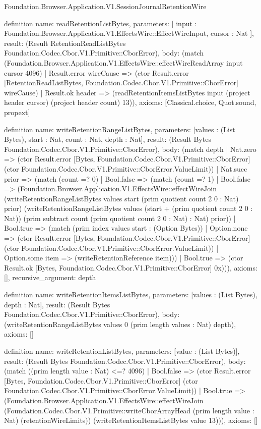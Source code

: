 \begin{lexlean}{Foundation.Browser.Application.V1.SessionJournalRetentionWire}
\begin{semanticmodule}
definition{
  name: readRetentionListBytes,
  parameters: [
    input : Foundation.Browser.Application.V1.EffectsWire::EffectWireInput,
    cursor : Nat
  ],
  result: (Result RetentionReadListBytes Foundation.Codec.Cbor.V1.Primitive::CborError),
  body: (match (Foundation.Browser.Application.V1.EffectsWire::effectWireReadArray input cursor 4096)
    | Result.error wireCause => (ctor Result.error [RetentionReadListBytes, Foundation.Codec.Cbor.V1.Primitive::CborError] wireCause)
    | Result.ok header => (readRetentionItemsListBytes input (project header cursor) (project header count) 13)),
  axioms: [Classical.choice, Quot.sound, propext]
}

definition{
  name: writeRetentionRangeListBytes,
  parameters: [values : (List Bytes), start : Nat, count : Nat, depth : Nat],
  result: (Result Bytes Foundation.Codec.Cbor.V1.Primitive::CborError),
  body: (match depth
    | Nat.zero => (ctor Result.error [Bytes, Foundation.Codec.Cbor.V1.Primitive::CborError] (ctor Foundation.Codec.Cbor.V1.Primitive::CborError.ValueLimit))
    | Nat.succ prior => (match (count =? 0)
      | Bool.false => (match (count =? 1)
        | Bool.false => (Foundation.Browser.Application.V1.EffectsWire::effectWireJoin (writeRetentionRangeListBytes values start (prim quotient count 2 0 : Nat) prior) (writeRetentionRangeListBytes values (start + (prim quotient count 2 0 : Nat)) (prim subtract count (prim quotient count 2 0 : Nat) : Nat) prior))
        | Bool.true => (match (prim index values start : (Option Bytes))
          | Option.none => (ctor Result.error [Bytes, Foundation.Codec.Cbor.V1.Primitive::CborError] (ctor Foundation.Codec.Cbor.V1.Primitive::CborError.ValueLimit))
          | Option.some item => (writeRetentionReference item)))
      | Bool.true => (ctor Result.ok [Bytes, Foundation.Codec.Cbor.V1.Primitive::CborError] 0x))),
  axioms: [],
  recursive_argument: depth
}

definition{
  name: writeRetentionItemsListBytes,
  parameters: [values : (List Bytes), depth : Nat],
  result: (Result Bytes Foundation.Codec.Cbor.V1.Primitive::CborError),
  body: (writeRetentionRangeListBytes values 0 (prim length values : Nat) depth),
  axioms: []
}

definition{
  name: writeRetentionListBytes,
  parameters: [value : (List Bytes)],
  result: (Result Bytes Foundation.Codec.Cbor.V1.Primitive::CborError),
  body: (match ((prim length value : Nat) <=? 4096)
    | Bool.false => (ctor Result.error [Bytes, Foundation.Codec.Cbor.V1.Primitive::CborError] (ctor Foundation.Codec.Cbor.V1.Primitive::CborError.ValueLimit))
    | Bool.true => (Foundation.Browser.Application.V1.EffectsWire::effectWireJoin (Foundation.Codec.Cbor.V1.Primitive::writeCborArrayHead (prim length value : Nat) (retentionWireLimits)) (writeRetentionItemsListBytes value 13))),
  axioms: []
}


\end{semanticmodule}
\end{lexlean}
